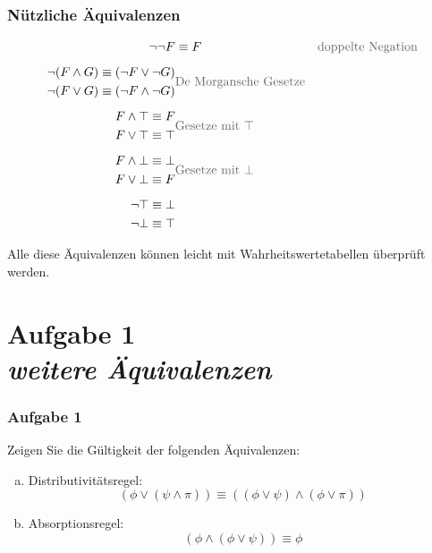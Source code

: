 \documentclass{beamer}
\begin{document}
	\begin{frame}\frametitle{Nützliche Äquivalenzen}
		\small
		\begin{align*}
			\neg\neg F &\equiv F
			& \text{\textcolor{devilscss}{doppelte Negation}}\\[1ex]
			\begin{split}
				\neg(F\wedge G) & \equiv (\neg F\vee \neg G)\\
				\neg(F\vee G) & \equiv (\neg F\wedge \neg G)
			\end{split}
			& \text{\textcolor{devilscss}{De Morgansche Gesetze}} \\[1ex]
			\begin{split}
				F\wedge \top & \equiv F\\
				F\vee \top & \equiv \top
			\end{split}
			& \text{\textcolor{devilscss}{Gesetze mit $\top$}}\\[1ex]
			\begin{split}
				F\wedge \bot & \equiv \bot\\
				F\vee \bot & \equiv F
			\end{split}
			& \text{\textcolor{devilscss}{Gesetze mit $\bot$}}\\[1ex]
			\begin{split}
				\neg\top & \equiv \bot\\
				\neg\bot & \equiv \top
			\end{split}
			& 
		\end{align*}
		
		Alle diese Äquivalenzen können leicht mit Wahrheitswertetabellen überprüft werden.
	\end{frame}


	\section{Aufgabe 1 \\ \itshape weitere Äquivalenzen}
	
	\begin{frame} \frametitle{Aufgabe 1}
		\small
		Zeigen Sie die Gültigkeit der folgenden Äquivalenzen:
		\begin{enumerate}[a)]
			\item Distributivitätsregel:
			\begin{equation*}
				(\phi \lor (\psi \land \pi)) \equiv ((\phi \lor \psi) \land (\phi \lor \pi))
			\end{equation*}
			\item Absorptionsregel:
			\begin{equation*}
				(\phi \land (\phi \lor \psi)) \equiv \phi
			\end{equation*}
		\end{enumerate}
	\end{frame}
	
\end{document}
